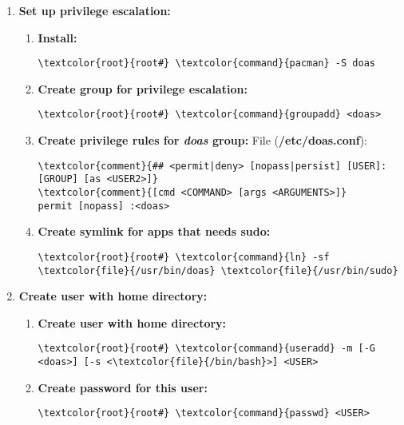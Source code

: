 \documentclass[10pt, a4paper, onecolumn, openany]{book} %
\begin{document}
\begin{enumerate}
    \item \textbf{Set up privilege escalation:}
    \begin{enumerate}
        \item \textbf{Install:}
\begin{Verbatim}[commandchars=\\\{\}]
\textcolor{root}{root#} \textcolor{command}{pacman} -S doas
\end{Verbatim}
        \item \textbf{Create group for privilege escalation:}
\begin{Verbatim}[commandchars=\\\{\}]
\textcolor{root}{root#} \textcolor{command}{groupadd} <doas>
\end{Verbatim}
        \item \textbf{Create privilege rules for \textit{doas} group:}
\newline File (\textbf{\textcolor{file}{/etc/doas.conf}}):
\begin{Verbatim}[commandchars=\\\{\}]
\textcolor{comment}{## <permit|deny> [nopass|persist] [USER]:[GROUP] [as <USER2>]}
\textcolor{comment}{[cmd <COMMAND> [args <ARGUMENTS>]}
permit [nopass] :<doas>
\end{Verbatim}
    \item \textbf{Create symlink for apps that needs sudo:}
\begin{Verbatim}[commandchars=\\\{\}]
\textcolor{root}{root#} \textcolor{command}{ln} -sf \textcolor{file}{/usr/bin/doas} \textcolor{file}{/usr/bin/sudo}
\end{Verbatim}
    \end{enumerate}
    
    \item \textbf{Create user with home directory:}
    \begin{enumerate}
        \item \textbf{Create user with home directory:}
\begin{Verbatim}[commandchars=\\\{\}]
\textcolor{root}{root#} \textcolor{command}{useradd} -m [-G <doas>] [-s <\textcolor{file}{/bin/bash}>] <USER>
\end{Verbatim}
        \item \textbf{Create password for this user:}
\begin{Verbatim}[commandchars=\\\{\}]
\textcolor{root}{root#} \textcolor{command}{passwd} <USER>
\end{Verbatim}
    \end{enumerate}
\end{enumerate}
\end{document}
